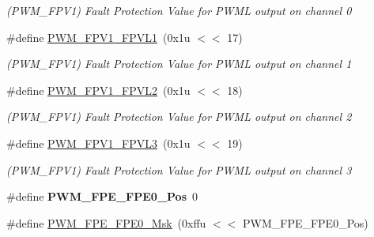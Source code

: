 \begin{DoxyCompactItemize}
\begin{DoxyCompactList}\small\item\em (P\+W\+M\+\_\+\+F\+P\+V1) Fault Protection Value for P\+W\+ML output on channel 0 \end{DoxyCompactList}\item 
\mbox{\label{group__SAME70__PWM_ga25d587b4254153c0fe30eaa3ef5443e8}} 
\#define \mbox{\hyperlink{group__SAME70__PWM_ga25d587b4254153c0fe30eaa3ef5443e8}{P\+W\+M\+\_\+\+F\+P\+V1\+\_\+\+F\+P\+V\+L1}}~(0x1u $<$$<$ 17)
\begin{DoxyCompactList}\small\item\em (P\+W\+M\+\_\+\+F\+P\+V1) Fault Protection Value for P\+W\+ML output on channel 1 \end{DoxyCompactList}\item 
\mbox{\label{group__SAME70__PWM_gafe428a8ac4e577fcc2b578452b10fa4f}} 
\#define \mbox{\hyperlink{group__SAME70__PWM_gafe428a8ac4e577fcc2b578452b10fa4f}{P\+W\+M\+\_\+\+F\+P\+V1\+\_\+\+F\+P\+V\+L2}}~(0x1u $<$$<$ 18)
\begin{DoxyCompactList}\small\item\em (P\+W\+M\+\_\+\+F\+P\+V1) Fault Protection Value for P\+W\+ML output on channel 2 \end{DoxyCompactList}\item 
\mbox{\label{group__SAME70__PWM_ga7e0af5cbe9fed2f4df286fc02af113bf}} 
\#define \mbox{\hyperlink{group__SAME70__PWM_ga7e0af5cbe9fed2f4df286fc02af113bf}{P\+W\+M\+\_\+\+F\+P\+V1\+\_\+\+F\+P\+V\+L3}}~(0x1u $<$$<$ 19)
\begin{DoxyCompactList}\small\item\em (P\+W\+M\+\_\+\+F\+P\+V1) Fault Protection Value for P\+W\+ML output on channel 3 \end{DoxyCompactList}\item 
\mbox{\label{group__SAME70__PWM_ga44078a843929dc1c69281b78ac024c86}} 
\#define {\bfseries P\+W\+M\+\_\+\+F\+P\+E\+\_\+\+F\+P\+E0\+\_\+\+Pos}~0
\item 
\mbox{\label{group__SAME70__PWM_ga883b1a6b32d3255fe62e1e584659cb30}} 
\#define \mbox{\hyperlink{group__SAME70__PWM_ga883b1a6b32d3255fe62e1e584659cb30}{P\+W\+M\+\_\+\+F\+P\+E\+\_\+\+F\+P\+E0\+\_\+\+Msk}}~(0xffu $<$$<$ P\+W\+M\+\_\+\+F\+P\+E\+\_\+\+F\+P\+E0\+\_\+\+Pos)

\end{DoxyCompactItemize}
